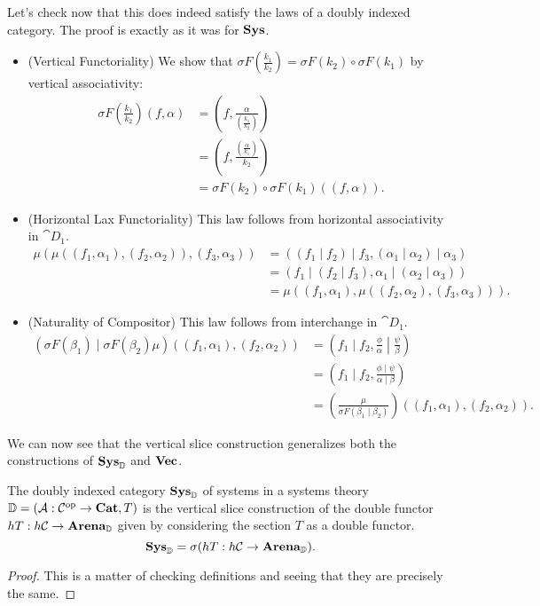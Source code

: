 \documentclass[DynamicalBook]{subfiles}
\begin{document}
Let's check now that this does indeed satisfy the laws of a doubly indexed
category. The proof is exactly as it was for $\textbf{Sys}$. 
\begin{itemize}
  \item (Vertical Functoriality) We show that $\sigma F\left(
      \frac{k_1}{k_2} \right) =
    \sigma F(k_2) \circ \sigma F (k_1)$ by
    vertical associativity:
\begin{align*}
  \sigma F\left(\frac{k_1}{k_2}\right)(f, \alpha) &= \left(f,  \frac{\alpha}{\left( \frac{k_1}{k_2} \right)} \right) \\
&= \left(f, \frac{\left( \frac{\alpha}{k_1} \right)}{k_2}   \right)\\
&= \sigma F(k_2) \circ \sigma F (k_1)((f, \alpha)).
\end{align*}

\item (Horizontal Lax Functoriality) This law follows from horizontal
  associativity in $\cat{D}_1$.
\begin{align*}
  \mu(\mu((f_1, \alpha_1), (f_2, \alpha_2)), (f_3, \alpha_3)) &= ((f_1 \mid f_2) \mid f_3, (\alpha_1 \mid \alpha_2) \mid \alpha_3) \\
&= (f_1 \mid (f_2 \mid f_3), \alpha_1 \mid (\alpha_2 \mid \alpha_3)) \\
&= \mu((f_1, \alpha_1), \mu((f_2, \alpha_2), (f_3, \alpha_3))).
\end{align*}
\item (Naturality of Compositor) This law follows from interchange in
  $\cat{D}_1$.
\begin{align*}
  \left( \sigma F(\beta_1) \mid \sigma F(\beta_2){\mu} \right)((f_1, \alpha_1), (f_2, \alpha_2)) &= \left(f_1 \mid f_2,   \left. \frac{\phi}{\alpha} \middle| \frac{\psi}{\beta} \right.\right) \\
&= \left(f_1 \mid f_2,  \frac{\phi \mid \psi}{\alpha \mid \beta}\right) \\
&= \left(  \frac{\mu}{\sigma F(\beta_1 \mid \beta_2)}\right)((f_1,\alpha_1),(f_2,\alpha_2)).
\end{align*}
\end{itemize}

We can now see that the vertical slice construction generalizes both the
constructions of $\textbf{Sys}_{\mathbb{D}}$ and $\textbf{Vec}$. 
\begin{proposition}\label{prop.sys_is_vertical_slice}
  The doubly indexed category $\textbf{Sys}_{\mathbb{D}}$ of systems in a systems theory
  $\mathbb{D} = (\mathcal{A} : \mathcal{C}^{\textnormal{op}} \to \textbf{Cat}, T)$ is the vertical slice
  construction of the double functor $hT : h\mathcal{C} \to
  \textbf{Arena}_{\mathbb{D}}$ given by considering the section $T$ as a double
  functor.
$$\textbf{Sys}_{\mathbb{D}} = \sigma (hT : h\mathcal{C} \to \textbf{Arena}_{\mathbb{D}}).$$
\end{proposition}
\begin{proof}
This is a matter of checking definitions and seeing that they are precisely the same.
\end{proof}
\end{document}
